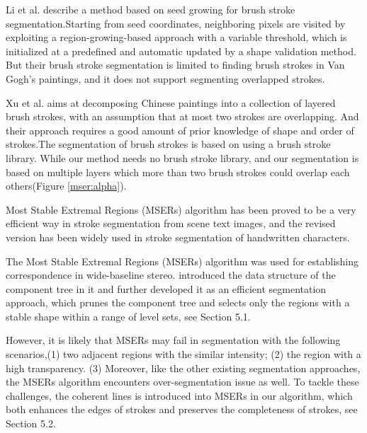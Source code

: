 Li et al.\cite{li2012rhythmic} describe a method based on seed growing for brush stroke segmentation.Starting from seed coordinates, neighboring pixels are visited by exploiting a region-growing-based approach with a variable threshold, which is initialized at a predefined and automatic updated by a shape validation method. But their brush stroke segmentation is limited to finding brush strokes in Van Gogh's paintings, and it does not support segmenting overlapped strokes.

Xu et al.\cite{xu2006animating} aims at decomposing Chinese paintings into a collection of layered brush strokes, with an assumption that at most two strokes are overlapping. And their approach requires a good amount of prior knowledge of shape and order of strokes.The segmentation of brush strokes is based on using a brush stroke library. While our method needs no brush stroke library, and our segmentation is based on multiple layers which more than two brush strokes could overlap each others(Figure \ref{mser:alpha}). 

Most Stable Extremal Regions (MSERs) algorithm\cite{matas2004robust} has been proved to be a very efficient way in stroke segmentation from scene text images\cite{neumann2011text}\cite{gomez2013multi}, 
and the revised version has been widely used in stroke segmentation of handwritten characters\cite{gomez2016fast}.

The Most Stable Extremal Regions (MSERs) algorithm\cite{matas2004robust} was used for establishing correspondence in wide-baseline stereo.\cite{donoser2006efficient} introduced the data structure of the component tree in it and further developed it as an efficient segmentation approach, which prunes the component tree and selects only the regions with a stable shape within a range of level sets, see Section 5.1.

However, it is likely that MSERs may fail in segmentation with the following scenarios,\newline (1) two adjacent regions with the similar intensity; \newline (2) the region with a high transparency. \newline
(3) Moreover, like the other existing segmentation approaches, the MSERs algorithm encounters over-segmentation issue as well. To tackle these challenges, the coherent lines \cite{kang2007coherent} is introduced into MSERs in our algorithm, which both enhances the edges of strokes and preserves the completeness of strokes, see Section 5.2. 

\newpage